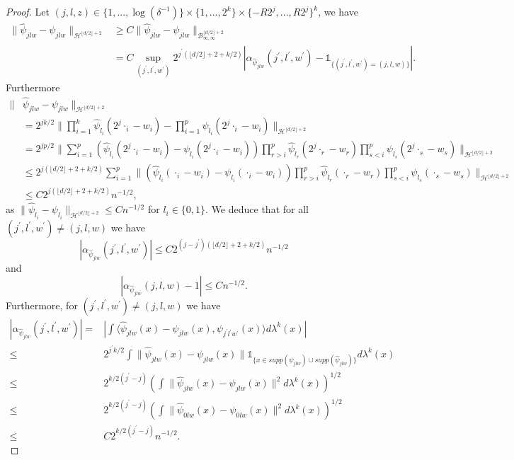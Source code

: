 \documentclass[10pt,a4paper]{amsart}
\begin{document}
\begin{proof}
Let $(j,l,z)\in \{1,...,\log(\delta^{-1})\}\times \{1,...,2^k\}\times \{-R2^{j},...,R2^j\}^k$, we have 
\begin{align*}
    \|\hat{\psi}_{jlw}-\psi_{jlw}\|_{\mathcal{H}^{\lfloor d/2 \rfloor +2}} & \geq C \|\hat{\psi}_{jlw}-\psi_{jlw}\|_{\mathcal{B}^{\lfloor d/2 \rfloor +2}_{\infty,\infty}}\\
    & = C\sup \limits_{(j^{'},l^{'},w^{'})}2^{j^{'}(\lfloor d/2 \rfloor +2+k/2)}|\alpha_{\hat{\psi}_{jlw}}(j^{'},l^{'},w^{'})-\mathds{1}_{\{(j^{'},l^{'},w^{'})=(j,l,w)\}}|.
\end{align*}
Furthermore
\begin{align*}
    \|& \hat{\psi}_{jlw}-\psi_{jlw}\|_{\mathcal{H}^{\lfloor d/2 \rfloor +2}} \\
    &=2^{jk/2}\|\prod \limits_{i=1}^k \hat{\psi}_{l_i}(2^j\cdot_i-w_i)-\prod \limits_{i=1}^p \psi_{l_i}(2^j\cdot_i-w_i)\|_{\mathcal{H}^{\lfloor d/2 \rfloor +2}}\\
    & =2^{jp/2}\|\sum \limits_{i=1}^p (\hat{\psi}_{l_i}(2^j\cdot_i-w_i)-\psi_{l_i}(2^j\cdot_i-w_i))\prod \limits_{r>i}^p \hat{\psi}_{l_r}(2^j\cdot_r-w_r)\prod \limits_{s<i}^p \psi_{l_s}(2^j\cdot_s-w_s)\|_{\mathcal{H}^{\lfloor d/2 \rfloor +2}}\\
    & \leq 2^{j(\lfloor d/2 \rfloor +2+k/2)}\sum \limits_{i=1}^p \| (\hat{\psi}_{l_i}(\cdot_i-w_i)-\psi_{l_i}(\cdot_i-w_i))\prod \limits_{r>i}^p \hat{\psi}_{l_r}(\cdot_r-w_r)\prod \limits_{s<i}^p \psi_{l_s}(\cdot_s-w_s)\|_{\mathcal{H}^{\lfloor d/2 \rfloor +2}}\\
    & \leq C 2^{j(\lfloor d/2 \rfloor +2+k/2)}n^{-1/2},
\end{align*}
as $\|\hat{\psi}_{l_i}-\psi_{l_i}\|_{\mathcal{H}^{\lfloor d/2 \rfloor +2}} \leq Cn^{-1/2}$ for $l_i\in \{0,1\}$.
We deduce that for all $(j^{'},l^{'},w^{'})\neq(j,l,w)$ we have
$$
|\alpha_{\hat{\psi}_{jlw}}(j^{'},l^{'},w^{'})|\leq C2^{(j-j^{'})(\lfloor d/2 \rfloor +2+k/2)}n^{-1/2}
$$
and 
$$
|\alpha_{\hat{\psi}_{jlw}}(j,l,w)-1|\leq Cn^{-1/2}.
$$
Furthermore, for $(j^{'},l^{'},w^{'})\neq(j,l,w)$ we have
\begin{align*}
    |\alpha_{\hat{\psi}_{jlw}}(j^{'},l^{'},w^{'})|=&|\int \langle \hat{\psi}_{jlw}(x)-\psi_{jlw}(x),\psi_{j^{'}l^{'}w^{'}}(x) \rangle d\lambda^k(x) |\\
    \leq & 2^{j^{'}k/2}\int \| \hat{\psi}_{jlw}(x)-\psi_{jlw}(x)\| \mathds{1}_{\{x\in supp(\psi_{jlw})\cup supp(\hat{\psi}_{jlw}) \}}d\lambda^k(x) \\
    \leq & 2^{k/2(j^{'}-j)}\left(\int \| \hat{\psi}_{jlw}(x)-\psi_{jlw}(x)\|^2d\lambda^k(x)\right)^{1/2} \\
    \leq & 2^{k/2(j^{'}-j)}\left(\int \| \hat{\psi}_{0lw}(x)-\psi_{0lw}(x)\|^2d\lambda^k(x)\right)^{1/2}  \\
    \leq & C 2^{k/2(j^{'}-j)}n^{-1/2}.
\end{align*}


\end{proof}
\end{document}
